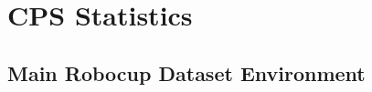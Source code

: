 \documentclass[11pt]{report}
\begin{document}
%
%
%

\section{CPS Statistics}
\label{app:cps}

\subsection{Main Robocup Dataset Environment}
\label{app:mrd}
\end{document}
